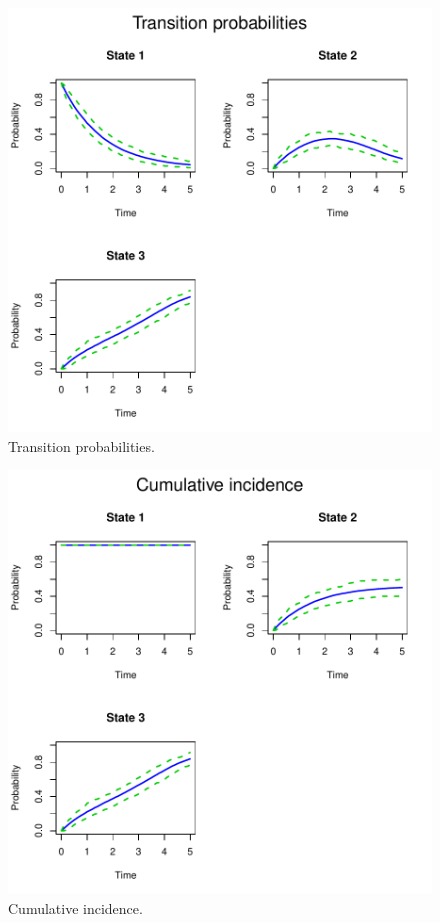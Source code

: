\begin{figure} 
\begin{center}
\includegraphics{PDF/Application-postPlot}
\end{center}
\caption{Transition probabilities.}
\label{fig:postProb}
\end{figure}

\begin{figure} 
\begin{center}
\includegraphics{PDF/Application-cincPlot}
\end{center}
\caption{Cumulative incidence.}
\label{fig:cincProb}
\end{figure}

